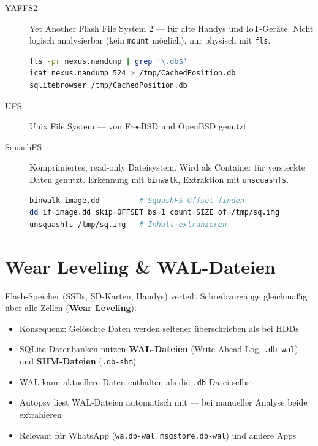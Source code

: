 \begin{description}
	\item[YAFFS2] Yet Another Flash File System 2 — für alte Handys und IoT-Geräte.
		Nicht logisch analysierbar (kein \texttt{mount} möglich), nur physisch mit \texttt{fls}.
\begin{lstlisting}[language=bash]
fls -pr nexus.nandump | grep '\.db$'
icat nexus.nandump 524 > /tmp/CachedPosition.db
sqlitebrowser /tmp/CachedPosition.db
\end{lstlisting}
	\item[UFS] Unix File System — von FreeBSD und OpenBSD genutzt.
	\item[SquashFS] Komprimiertes, read-only Dateisystem.
		Wird als Container für versteckte Daten genutzt.
		Erkennung mit \texttt{binwalk}, Extraktion mit \texttt{unsquashfs}.
\begin{lstlisting}[language=bash]
binwalk image.dd         # SquashFS-Offset finden
dd if=image.dd skip=OFFSET bs=1 count=SIZE of=/tmp/sq.img
unsquashfs /tmp/sq.img   # Inhalt extrahieren
\end{lstlisting}
\end{description}

\section{Wear Leveling \& WAL-Dateien}

Flash-Speicher (SSDs, SD-Karten, Handys) verteilt Schreibvorgänge gleichmäßig über alle Zellen (\textbf{Wear Leveling}).

\begin{itemize}
	\item Konsequenz: Gelöschte Daten werden seltener überschrieben als bei HDDs
	\item SQLite-Datenbanken nutzen \textbf{WAL-Dateien} (Write-Ahead Log, \texttt{.db-wal}) und \textbf{SHM-Dateien} (\texttt{.db-shm})
	\item WAL kann aktuellere Daten enthalten als die \texttt{.db}-Datei selbst
	\item Autopsy liest WAL-Dateien automatisch mit — bei manueller Analyse beide extrahieren
	\item Relevant für WhatsApp (\texttt{wa.db-wal}, \texttt{msgstore.db-wal}) und andere Apps
\end{itemize}
